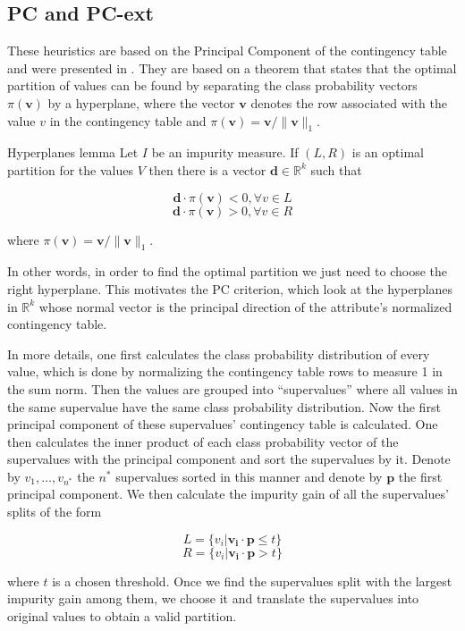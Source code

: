 \subsection{PC and PC-ext}
These heuristics are based on the Principal Component of the contingency table and were presented in \cite{journals/datamine/CoppersmithHH99}. They are based on a theorem that states that the optimal partition of values can be found by separating the class probability vectors $\pi(\mathbf{v})$ by a hyperplane, where the vector $\mathbf{v}$ denotes the row associated with the value $v$ in the contingency table and $\pi(\mathbf{v}) = \mathbf{v} / \lVert \mathbf{v} \rVert_1$.

\begin{theorem}{Hyperplanes lemma}
 Let $I$ be an impurity measure. If $(L, R)$ is an optimal partition for the values $V$ then there is a vector $\mathbf{d} \in \mathbb{R}^k$ such that
 
 $$\mathbf{d} \cdot \pi(\mathbf{v}) < 0, \forall v \in L$$
 $$\mathbf{d} \cdot \pi(\mathbf{v}) > 0, \forall v \in R$$
 
 where $\pi(\mathbf{v}) = \mathbf{v} / \lVert \mathbf{v} \rVert_1$.
\end{theorem}


In other words, in order to find the optimal partition we just need to choose the right hyperplane. This motivates the PC criterion, which look at the hyperplanes in $\mathbb{R}^k$ whose normal vector is the principal direction of the attribute's normalized contingency table.

In more details, one first calculates the class probability distribution of every value, which is done by normalizing the contingency table rows to measure 1 in the sum norm. Then the values are grouped into ``supervalues'' where all values in the same supervalue have the same class probability distribution. Now the first principal component of these supervalues' contingency table is calculated. One then calculates the inner product of each class probability vector of the supervalues  with the principal component and sort the supervalues by it. Denote by $v_1,\ldots,v_{n^*}$ the $n^*$ supervalues sorted in this manner and denote by $\mathbf{p}$ the first principal component. We then calculate the impurity gain of all the supervalues' splits of the form

$$L = \{v_i | \mathbf{v_i} \cdot \mathbf{p} \leq t\}$$
$$R = \{v_i | \mathbf{v_i} \cdot \mathbf{p} > t\}$$

where $t$ is a chosen threshold. Once we find the supervalues split with the largest impurity gain among them, we choose it and translate the supervalues into original values to obtain a valid partition.

